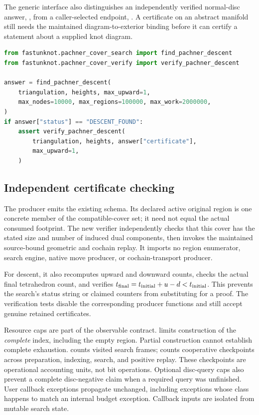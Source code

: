 The generic interface also distinguishes an independently verified normal-disc
answer, , from a caller-selected endpoint,
. A certificate on an abstract manifold still needs
the maintained diagram-to-exterior binding before it can certify a statement
about a supplied knot diagram.

\begin{lstlisting}[language=Python,float=htbp,caption={Complete bounded descent with an independently checked positive witness.}]
from fastunknot.pachner_cover_search import find_pachner_descent
from fastunknot.pachner_cover_verify import verify_pachner_descent

answer = find_pachner_descent(
    triangulation, heights, max_upward=1,
    max_nodes=10000, max_regions=100000, max_work=2000000,
)
if answer["status"] == "DESCENT_FOUND":
    assert verify_pachner_descent(
        triangulation, heights, answer["certificate"],
        max_upward=1,
    )
\end{lstlisting}

\subsection{Independent certificate checking}

The producer emits the existing
 schema. Its declared active original
region is one concrete member of the compatible-cover set; it need not
equal the actual consumed footprint. The new verifier independently checks
that this cover has the stated size and number of induced dual components,
then invokes the maintained source-bound geometric and cochain replay.
It imports no region enumerator, search engine, native move producer, or
cochain-transport producer.

For descent, it also recomputes upward and downward counts, checks the
actual final tetrahedron count, and verifies
$t_{\rm final}=t_{\rm initial}+u-d<t_{\rm initial}$. This prevents the
search's status string or claimed counters from substituting for a proof.
The verification tests disable the corresponding producer functions and
still accept genuine retained certificates.

Resource caps are part of the observable contract. 
limits construction of the \emph{complete} index, including the empty
region. Partial construction cannot establish complete exhaustion.
 counts visited search frames;  counts
cooperative checkpoints across preparation, indexing, search, and positive
replay. These checkpoints are operational accounting units, not bit
operations. Optional disc-query caps also prevent a complete disc-negative
claim when a required query was unfinished. User callback exceptions
propagate unchanged, including exceptions whose class happens to match an
internal budget exception. Callback inputs are isolated from mutable search
state.

